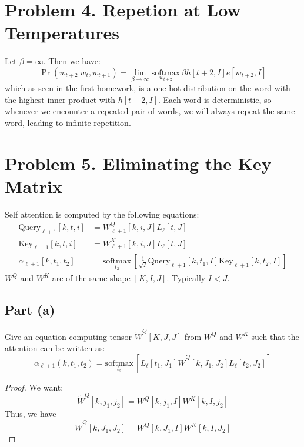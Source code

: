 \documentclass{amsart}
\theoremstyle{definition}
\begin{document}
\section*{Problem 4. Repetion at Low Temperatures}
Let $\beta = \infty$. Then we have:
\[
\Pr(w_{t + 2} | w_{t}, w_{t + 1}) = \lim_{\beta \to \infty} \underset{w_{t + 2}}{\mathrm{softmax}}\,\beta h[t + 2, I] e[w_{t + 2}, I]
\]
which as seen in the first homework, is a one-hot distribution on the word with the highest inner product with $h[t + 2, I]$.
Each word is deterministic, so whenever we encounter a repeated pair of words, we will always repeat the same word, leading to infinite repetition.

\section*{Problem 5. Eliminating the Key Matrix}
Self attention is computed by the following equations:
\begin{align*}
    \mathrm{Query}_{\ell + 1} [k, t, i] &= W^Q_{\ell + 1}[k, i, J] L_{\ell}[t, J] \\
    \mathrm{Key}_{\ell + 1} [k, t, i] &= W^K_{\ell + 1}[k, i, J] L_{\ell}[t, J] \\
    \alpha_{\ell + 1} [k, t_1, t_2] &= \underset{t_2}{\mathrm{softmax}}\, \left[
        \frac1{\sqrt{I}} \mathrm{Query}_{\ell + 1} [k, t_1, I] \mathrm{Key}_{\ell + 1} [k, t_2, I]
    \right]
\end{align*}
$W^Q$ and $W^K$ are of the same shape $[K, I, J]$. Typically $I < J$.
\subsection*{Part (a)} Give an equation computing tensor $\tilde{W}^Q[K, J, J]$ from $W^Q$ and $W^K$ such that the attention can be written as:
\[
\alpha_{\ell + 1} (k, t_1, t_2) = \underset{t_2}{\mathrm{softmax}}\, \left[
    L_{\ell} [t_1, J_1] \tilde{W}^Q [k, J_1, J_2] L_{\ell} [t_2, J_2]
\right]
\]
\begin{proof}
    We want:
    \[
    \tilde{W}^Q[k, j_1, j_2] = W^Q[k, j_1, I] W^K[k, I, j_2]
    \]
    Thus, we have 
    \[
    \tilde{W}^Q[k, J_1, J_2] = W^Q[k, J_1, I] W^K[k, I, J_2]
    \]
\end{proof}
\end{document}
